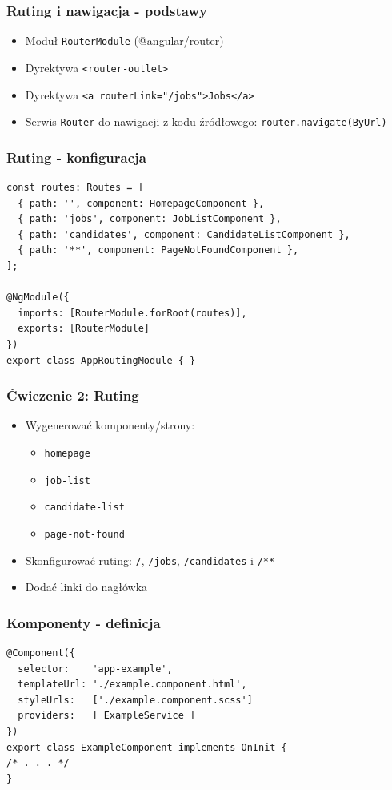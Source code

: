 \documentclass{beamer}
\begin{document}
\begin{frame}
    \frametitle{Ruting i nawigacja - podstawy}
    \begin{itemize}
        \item Moduł \lstinline{RouterModule} (@angular/router)
        \item Dyrektywa \lstinline{<router-outlet>}
        \item Dyrektywa \lstinline{<a routerLink="/jobs">Jobs</a>}
        \item Serwis \lstinline{Router} do nawigacji z kodu źródłowego: \lstinline{router.navigate(ByUrl)}
    \end{itemize}
\end{frame}

\begin{frame}[fragile]
    \frametitle{Ruting - konfiguracja}
\begin{lstlisting}
const routes: Routes = [
  { path: '', component: HomepageComponent },
  { path: 'jobs', component: JobListComponent },
  { path: 'candidates', component: CandidateListComponent },
  { path: '**', component: PageNotFoundComponent },
];

@NgModule({
  imports: [RouterModule.forRoot(routes)],
  exports: [RouterModule]
})
export class AppRoutingModule { }
\end{lstlisting}
\end{frame}

\begin{frame}
    \frametitle{Ćwiczenie 2: Ruting}
    \begin{itemize}
        \item Wygenerować komponenty/strony:
	    \begin{itemize}
                \item \lstinline{homepage}
                \item \lstinline{job-list}
                \item \lstinline{candidate-list}
                \item \lstinline{page-not-found}
	    \end{itemize}
        \item Skonfigurować ruting: \lstinline{/}, \lstinline{/jobs}, \lstinline{/candidates} i \lstinline{/**}
        \item Dodać linki do nagłówka
    \end{itemize}
\end{frame}

\begin{frame}[fragile]
    \frametitle{Komponenty - definicja}
\begin{lstlisting}
@Component({
  selector:    'app-example',
  templateUrl: './example.component.html',
  styleUrls:   ['./example.component.scss']
  providers:   [ ExampleService ]
})
export class ExampleComponent implements OnInit {
/* . . . */
}
\end{lstlisting}
\end{frame}
\end{document}
